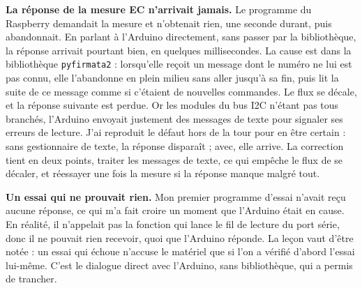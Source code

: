 \textbf{La réponse de la mesure EC n'arrivait jamais.} Le programme du Raspberry demandait la mesure et n'obtenait rien, une seconde durant, puis abandonnait. En parlant à l'Arduino directement, sans passer par la bibliothèque, la réponse arrivait pourtant bien, en quelques millisecondes. La cause est dans la bibliothèque \texttt{pyfirmata2} : lorsqu'elle reçoit un message dont le numéro ne lui est pas connu, elle l'abandonne en plein milieu sans aller jusqu'à sa fin, puis lit la suite de ce message comme si c'étaient de nouvelles commandes. Le flux se décale, et la réponse suivante est perdue. Or les modules du bus I2C n'étant pas tous branchés, l'Arduino envoyait justement des messages de texte pour signaler ses erreurs de lecture. J'ai reproduit le défaut hors de la tour pour en être certain : sans gestionnaire de texte, la réponse disparaît ; avec, elle arrive. La correction tient en deux points, traiter les messages de texte, ce qui empêche le flux de se décaler, et réessayer une fois la mesure si la réponse manque malgré tout.

\textbf{Un essai qui ne prouvait rien.} Mon premier programme d'essai n'avait reçu aucune réponse, ce qui m'a fait croire un moment que l'Arduino était en cause. En réalité, il n'appelait pas la fonction qui lance le fil de lecture du port série, donc il ne pouvait rien recevoir, quoi que l'Arduino réponde. La leçon vaut d'être notée : un essai qui échoue n'accuse le matériel que si l'on a vérifié d'abord l'essai lui-même. C'est le dialogue direct avec l'Arduino, sans bibliothèque, qui a permis de trancher.
